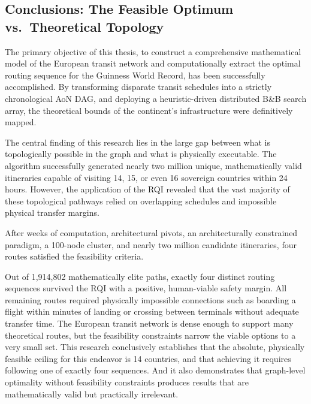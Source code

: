 \subsection{Conclusions: The Feasible Optimum vs.\ Theoretical Topology}
\label{subsec:conclusions_feasible_vs_theoretical}

The primary objective of this thesis, to construct a comprehensive mathematical model of the European transit network and computationally extract the optimal routing sequence for the Guinness World Record, has been successfully accomplished. By transforming disparate transit schedules into a strictly chronological AoN DAG, and deploying a heuristic-driven distributed B\&B search array, the theoretical bounds of the continent's infrastructure were definitively mapped.

\medskip

The central finding of this research lies in the large gap between what is topologically possible in the graph and what is physically executable. The algorithm successfully generated nearly two million unique, mathematically valid itineraries capable of visiting 14, 15, or even 16 sovereign countries within 24 hours. However, the application of the RQI revealed that the vast majority of these topological pathways relied on overlapping schedules and impossible physical transfer margins.

\medskip

After weeks of computation, architectural pivots, an architecturally constrained paradigm, a 100-node cluster, and nearly two million candidate itineraries, four routes satisfied the feasibility criteria.

\medskip

Out of 1,914,802 mathematically elite paths, exactly four distinct routing sequences survived the RQI with a positive, human-viable safety margin. All remaining routes required physically impossible connections such as boarding a flight within minutes of landing or crossing between terminals without adequate transfer time. The European transit network is dense enough to support many theoretical routes, but the feasibility constraints narrow the viable options to a very small set. This research conclusively establishes that the absolute, physically feasible ceiling for this endeavor is 14 countries, and that achieving it requires following one of exactly four sequences. And it also demonstrates that graph-level optimality without feasibility constraints produces results that are mathematically valid but practically irrelevant.

